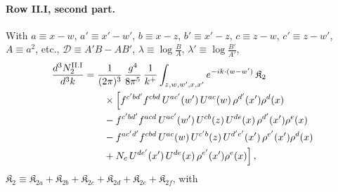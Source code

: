 \paragraph{Row II.I, second part.} With $a\equiv x-w$, $a'\equiv x'-w'$, $b\equiv x-z$, $b'\equiv x'-z$, $c\equiv z-w$, $c'\equiv z-w'$, $A\equiv a^2$, etc., $\mathcal D\equiv A'B-AB'$, $\lambda\equiv\log\frac{B}{A}$, $\lambda'\equiv\log\frac{B'}{A'}$,
\begin{align}\label{eq:app_III2}
\frac{d^3N^{\rm II.I}_2}{d^3k}&=\frac{1}{(2\pi)^3}\,\frac{g^4}{8\pi^5}\,\frac{1}{k^+}\int_{z,w,w',x,x'}e^{-ik\cdot(w-w')}\,\mathfrak K_2\notag\\&\qquad\times\Big[f^{c'bd'}f^{cbd}\,U^{ac'}(w')\,U^{ac}(w)\,\rho^{d'}(x')\rho^d(x)\notag\\
&\qquad-f^{c'bd'}f^{acd}\,U^{ac'}(w')\,U^{cb}(z)\,U^{de}(x)\,\rho^{d'}(x')\rho^e(x)\notag\\
&\qquad-f^{ac'd'}f^{cbd}\,U^{ac}(w)\,U^{c'b}(z)\,U^{d'e'}(x')\,\rho^{e'}(x')\rho^d(x)\notag\\&\qquad+N_c\,U^{de'}(x')\,U^{de}(x)\,\rho^{e'}(x')\rho^e(x)\Big]\,,
\end{align}
$\mathfrak K_2\equiv\mathfrak K_{2a}+\mathfrak K_{2b}+\mathfrak K_{2c}+\mathfrak K_{2d}+\mathfrak K_{2e}+\mathfrak K_{2f}$, with

